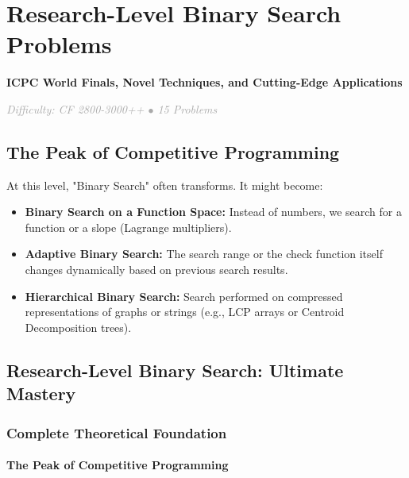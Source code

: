 \documentclass[11pt,a4paper,oneside]{book}
\begin{document}
\chapter{Research-Level Binary Search Problems}

\begin{tcolorbox}[
    enhanced,
    colback=white,
    colframe=secondaryblue,
    boxrule=1pt,
    arc=2mm,
    left=10pt,
    right=10pt
]
\textbf{\large\textcolor{primaryblue}{ICPC World Finals, Novel Techniques, and Cutting-Edge Applications}}
\end{tcolorbox}

\vspace{0.5cm}

\begin{center}
\textit{\textcolor{darkgray}{Difficulty: CF 2800-3000++ $\bullet$ 15 Problems}}
\end{center}

\section{The Peak of Competitive Programming}

At this level, "Binary Search" often transforms. It might become:
\begin{itemize}
    \item \textbf{Binary Search on a Function Space:} Instead of numbers, we search for a function or a slope (Lagrange multipliers).
    \item \textbf{Adaptive Binary Search:} The search range or the check function itself changes dynamically based on previous search results.
    \item \textbf{Hierarchical Binary Search:} Search performed on compressed representations of graphs or strings (e.g., LCP arrays or Centroid Decomposition trees).
\end{itemize}

\section{Research-Level Binary Search: Ultimate Mastery}

\subsection{Complete Theoretical Foundation}

\subsubsection{The Peak of Competitive Programming}
\end{document}

